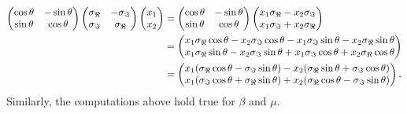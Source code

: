 \documentclass[aps,showpacs,preprintnumbers,amsmath,amssymb,twocolumn,superscriptaddress,floatfix,nofootinbib,10pt,pre]{revtex4-1}
\begin{document}
{\begin{align}
\begin{pmatrix}
    \cos\theta & -\sin\theta \\
    \sin\theta & \cos\theta
\end{pmatrix}
\begin{pmatrix}
    \sigma_{\Re} & -\sigma_{\Im} \\
    \sigma_{\Im} & \sigma_{\Re}
\end{pmatrix}\begin{pmatrix}
    x_1 \\ x_2
\end{pmatrix} &=
\begin{pmatrix}
    \cos\theta & -\sin\theta \\
    \sin\theta & \cos\theta
\end{pmatrix}\begin{pmatrix}
    x_1\sigma_{\Re}-x_2\sigma_{\Im} \\
    x_1\sigma_{\Im}+x_2\sigma_{\Re}
\end{pmatrix} \notag\\
&=
\begin{pmatrix}
    x_1\sigma_{\Re}\cos\theta-x_2\sigma_{\Im}\cos\theta-x_1\sigma_{\Im}\sin\theta-x_2\sigma_{\Re}\sin\theta \\
    x_1\sigma_{\Re}\sin\theta-x_2\sigma_{\Im}\sin\theta+x_1\sigma_{\Im}\cos\theta+x_2\sigma_{\Re}\cos\theta
\end{pmatrix}\notag\\
&=\begin{pmatrix}
    x_1(\sigma_{\Re}\cos\theta-\sigma_{\Im}\sin\theta)-x_2(\sigma_{\Re}\sin\theta+\sigma_{\Im}\cos\theta) \\   x_1(\sigma_{\Im}\cos\theta+\sigma_{\Re}\sin\theta)+x_2(\sigma_{\Re}\cos\theta-\sigma_{\Im}\sin\theta)
\end{pmatrix}.
\end{align} 
Similarly, the computations above hold true for $\beta$ and $\mu$.
}
\end{document}
